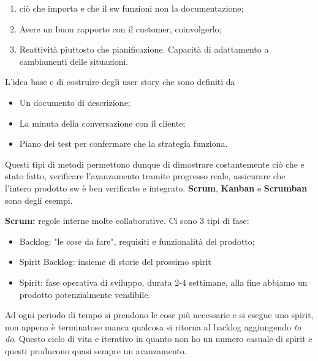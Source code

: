 \begin{itemize}
\begin{enumerate}
		\item ciò  che importa e che il sw funzioni non la documentazione;
	
		\item Avere un buon rapporto con il customer, coinvolgerlo;
	
		\item Reattività piuttosto che pianificazione. Capacità di adattamento a cambiamenti delle situazioni.

	\end{enumerate}
	L'idea base e di costruire degli user story che sono definiti da
		\begin{itemize}
			\item Un documento di descrizione;
			\item La minuta della conversazione con il cliente;
			\item Piano dei test per confermare che la strategia funziona.
		\end{itemize}
	Questi tipi di metodi permettono dunque di dimostrare costantemente ciò che e stato fatto, verificare l'avanzamento tramite progresso reale, assicurare che l'intero prodotto sw è ben verificato e integrato.
	\textbf{Scrum}, \textbf{Kanban} e \textbf{Scrumban} sono degli esempi.
\end{itemize}
\textbf{Scrum:} regole interne molte collaborative. Ci sono 3 tipi di fase:
	 \begin{itemize}
	 		\item Backlog: "le cose da fare", requisiti e funzionalità del prodotto;
	 		\item Spirit Backlog: insieme di storie del prossimo spirit
	 		\item Spirit: fase operativa di sviluppo, durata 2-4 settimane, alla fine abbiamo un prodotto potenzialmente vendibile.
	 \end{itemize}
Ad ogni periodo di tempo si prendono le cose più necessarie e si esegue uno spirit, non appena è terminatose manca qualcosa si ritorna al backlog aggiungendo \textit{to do}. Questo ciclo di vita e iterativo in quanto non ho un numero casuale di spirit e questi producono quasi sempre un avanzamento.

